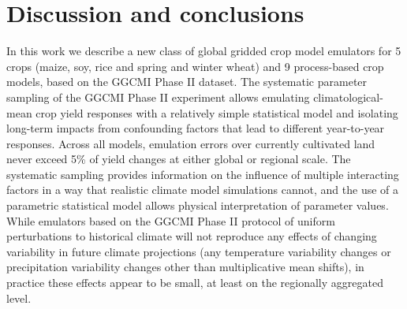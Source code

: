 \documentclass[gmdd]{copernicus} %
\begin{document}


\section{Discussion and conclusions} 
\label{S:6}
In this work we describe a new class of global gridded crop model emulators for 5 crops (maize, soy, rice and spring and winter wheat) and 9 process-based crop models, based on the  GGCMI Phase II dataset.
The systematic parameter sampling of the GGCMI Phase II experiment allows emulating climatological-mean crop yield responses with a relatively simple statistical model and isolating long-term impacts from confounding factors that lead to different year-to-year responses. 
Across all models, emulation errors over currently cultivated land never exceed 5\% of yield changes at either global or regional scale. 
The systematic sampling provides information on the influence of multiple interacting factors in a way that realistic climate model simulations cannot, and the use of a parametric statistical model allows physical interpretation of parameter values. 
While emulators based on the GGCMI Phase II protocol of uniform perturbations to historical climate will not reproduce any effects of changing variability in future climate projections (any temperature variability changes or precipitation variability changes other than multiplicative mean shifts), in practice these effects appear to be small, at least on the regionally aggregated level. 

\end{document}
